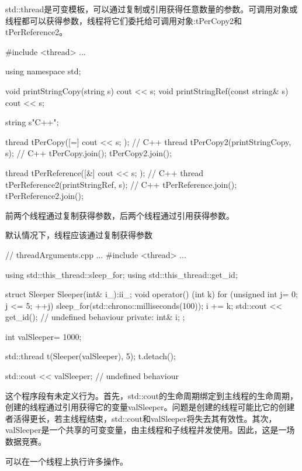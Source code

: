
std::thread是可变模板，可以通过复制或引用获得任意数量的参数。可调用对象或线程都可以获得参数，线程将它们委托给可调用对象:tPerCopy2和tPerReference2。

\begin{cpp}
#include <thread>
...

using namespace std;

void printStringCopy(string s){ cout << s; }
void printStringRef(const string& s){ cout << s; }

string s{"C++"};

thread tPerCopy([=]{ cout << s; }); // C++
thread tPerCopy2(printStringCopy, s); // C++
tPerCopy.join();
tPerCopy2.join();

thread tPerReference([&]{ cout << s; }); // C++
thread tPerReference2(printStringRef, s); // C++
tPerReference.join();
tPerReference2.join();
\end{cpp}

前两个线程通过复制获得参数，后两个线程通过引用获得参数。

\begin{myWarning}{默认情况下，线程应该通过复制获得参数}
	
\begin{cpp}
// threadArguments.cpp
...
#include <thread>
...

using std::this_thread::sleep_for;
using std::this_thread::get_id;

struct Sleeper{
	Sleeper(int& i_):i{i_}{};
	void operator() (int k){
		for (unsigned int j= 0; j <= 5; ++j){
			sleep_for(std::chrono::milliseconds(100));
			i += k;
		}
		std::cout << get_id(); // undefined behaviour
	}
	private:
	int& i;
};

int valSleeper= 1000;

std::thread t(Sleeper(valSleeper), 5);
t.detach();

std::cout << valSleeper; // undefined behaviour
\end{cpp}

这个程序段有未定义行为。首先，std::cout的生命周期绑定到主线程的生命周期，创建的线程通过引用获得它的变量valSleeper。问题是创建的线程可能比它的创建者活得更长，若主线程结束，std::cout和valSleeper将失去其有效性。其次，valSleeper是一个共享的可变变量，由主线程和子线程并发使用。因此，这是一场数据竞赛。
\end{myWarning}


可以在一个线程上执行许多操作。

